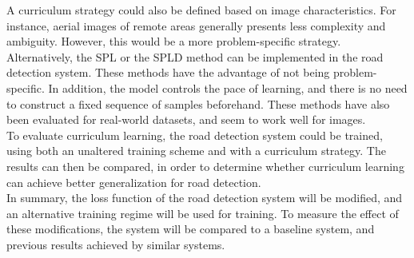 A curriculum strategy could also be defined based on image characteristics. For instance, aerial images of remote areas generally presents less complexity and ambiguity. However, this would be a more problem-specific strategy. \\ 

Alternatively, the \ac{SPL} or the \ac{SPLD} method \citep{Kumar_self_paced_learning} \citep{Lu_self-paced_learning_diversity} can be implemented in the road detection system. These methods have the advantage of not being problem-specific. In addition, the model controls the pace of learning, and there is no need to construct a fixed sequence of samples beforehand. These methods have also been evaluated for real-world datasets, and seem to work well for images. \\ 

To evaluate curriculum learning, the road detection system could be trained, using both an unaltered training scheme and with a curriculum strategy. The results can then be compared, in order to determine whether curriculum learning can achieve better generalization for road detection.\\


In summary, the loss function of the road detection system will be modified, and an alternative training regime will be used for training. To measure the effect of these modifications, the system will be compared to a baseline system, and previous results achieved by similar systems.
